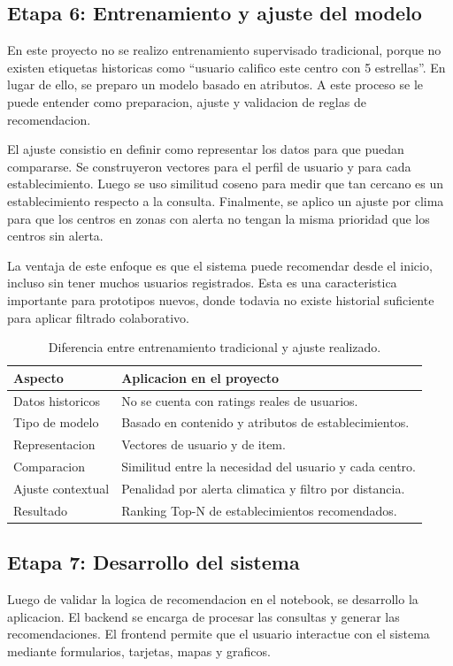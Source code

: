 \documentclass[12pt,a4paper]{article}
\begin{document}
\subsection{Etapa 6: Entrenamiento y ajuste del modelo}
En este proyecto no se realizo entrenamiento supervisado tradicional, porque no existen etiquetas historicas como ``usuario califico este centro con 5 estrellas''. En lugar de ello, se preparo un modelo basado en atributos. A este proceso se le puede entender como preparacion, ajuste y validacion de reglas de recomendacion.

El ajuste consistio en definir como representar los datos para que puedan compararse. Se construyeron vectores para el perfil de usuario y para cada establecimiento. Luego se uso similitud coseno para medir que tan cercano es un establecimiento respecto a la consulta. Finalmente, se aplico un ajuste por clima para que los centros en zonas con alerta no tengan la misma prioridad que los centros sin alerta.

La ventaja de este enfoque es que el sistema puede recomendar desde el inicio, incluso sin tener muchos usuarios registrados. Esta es una caracteristica importante para prototipos nuevos, donde todavia no existe historial suficiente para aplicar filtrado colaborativo.

\begin{table}[H]
\centering
\caption{Diferencia entre entrenamiento tradicional y ajuste realizado.}
\label{tab:entrenamiento}
\begin{tabular}{p{4.2cm}p{8.2cm}}
\toprule
Aspecto & Aplicacion en el proyecto \\
\midrule
Datos historicos & No se cuenta con ratings reales de usuarios. \\
Tipo de modelo & Basado en contenido y atributos de establecimientos. \\
Representacion & Vectores de usuario y de item. \\
Comparacion & Similitud entre la necesidad del usuario y cada centro. \\
Ajuste contextual & Penalidad por alerta climatica y filtro por distancia. \\
Resultado & Ranking Top-N de establecimientos recomendados. \\
\bottomrule
\end{tabular}
\end{table}

\subsection{Etapa 7: Desarrollo del sistema}
Luego de validar la logica de recomendacion en el notebook, se desarrollo la aplicacion. El backend se encarga de procesar las consultas y generar las recomendaciones. El frontend permite que el usuario interactue con el sistema mediante formularios, tarjetas, mapas y graficos.
\end{document}
